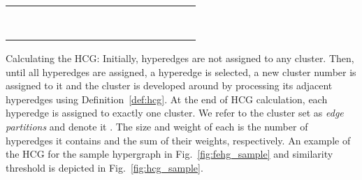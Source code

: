 \documentclass[twocolumn]{svjour3}          \smartqed
\begin{document}
\begin{table*}[ht]
{\begin{threeparttable}
\begin{tabular}{ccccccccccccccccc}
		 		& 		&		&		& 	
							& 		&		&		& 	
							& 		&		&		& 	
							& 		&		&		& 		\\
							
		 	& 		&		&		& 	
							& 		&		&		& 	
							& 		&		&		& 	
							& 		&		&		& 		\\
							
		 	& 		&		&		& 	
							& 		&		&		& 	
							& 		&		&		& 	
							& 		&		&		& 		\\
							
		 	& 		&		&		& 	
							& 		&		&		& 	
							& 		&		&		& 	
							& 		&		&		& 		\\
							
		 	& 		&		&		& 	
							& 		&		&		& 	
							& 		&		&		& 	
							& 		&		&		& 		\\
							
		 	& 		&		&		& 	
							& 		&		&		& 	
							& 		&		&		& 	
							& 		&		&		& 		\\
							
		 	& 		&		&		& 	
							& 		&		&		& 	
							& 		&		&		& 	
							& 		&		&		& 		\\
							
		 	& 		&		&		& 	
							& 		&		&		& 	
							& 		&		&		& 	
							& 		&		&		& 		\\
		
		\bottomrule
		\end{tabular}
	\end{threeparttable}
	} \end{table*}

Calculating the HCG: Initially, hyperedges are not assigned to any cluster.  Then, until all hyperedges are assigned,  a hyperedge  is selected, a new cluster number is assigned to it and the cluster is developed around  by processing its adjacent hyperedges using Definition~\ref{def:hcg}. At the end of HCG calculation, each hyperedge is assigned to exactly one cluster. We refer to the cluster set as \textit{edge partitions} and denote it . The size and weight of each  is the number of hyperedges it contains and the sum of their weights, respectively. An example of the HCG for the sample hypergraph in Fig.~\ref{fig:fehg_sample} and similarity threshold  is depicted in Fig.~\ref{fig:hcg_sample}.
\end{document}
